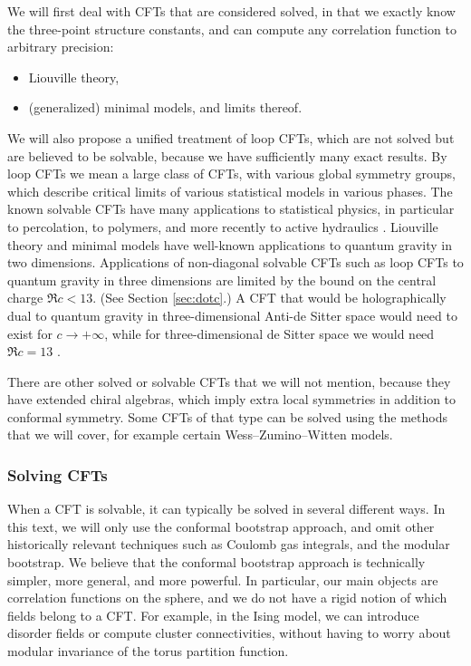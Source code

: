 \documentclass[12pt, a4paper]{article}
\theoremstyle{break}
\begin{document}
We will first deal with CFTs that are considered solved, in that we exactly know the three-point structure constants, and can compute any correlation function to arbitrary precision:
\begin{itemize}
 \item Liouville theory,
 \item (generalized) minimal models, and limits thereof. 
\end{itemize}
We will also propose a unified treatment of loop CFTs, which are not solved but are believed to be solvable, because we have sufficiently many exact results. By loop CFTs we mean a large class of CFTs, with various global symmetry groups, which describe critical limits of various statistical models in various phases. The known solvable CFTs have many applications to statistical physics, in particular to percolation, to polymers, and more recently to active hydraulics \cite{jcpb23}. Liouville theory and minimal models have well-known applications to quantum gravity in two dimensions. Applications of non-diagonal solvable CFTs such as loop CFTs to quantum gravity in three dimensions are limited by the bound on the central charge $\Re c < 13$. (See Section \ref{sec:dotc}.) A CFT that would be holographically dual to quantum gravity in three-dimensional Anti-de Sitter space would need to exist for $c\to+\infty$, while for three-dimensional de Sitter space we would need $\Re c = 13$ \cite{god24}. 

There are other solved or solvable CFTs that we will not mention, because they have extended chiral algebras, which imply extra local symmetries in addition to conformal symmetry. Some CFTs of that type can be solved using the methods that we will cover, for example certain Wess--Zumino--Witten models. 

\subsubsection*{Solving CFTs}

When a CFT is solvable, it can typically be solved in several different ways. In this text, we will only use the conformal bootstrap approach, and omit other historically relevant techniques such as Coulomb gas integrals, and the modular bootstrap. We believe that the conformal bootstrap approach is technically simpler, more general, and more powerful. In particular, our main objects are correlation functions on the sphere, and we do not have a rigid notion of which fields belong to a CFT. For example, in the Ising model, we can introduce disorder fields or compute cluster connectivities, without having to worry about modular invariance of the torus partition function. 
\end{document}
